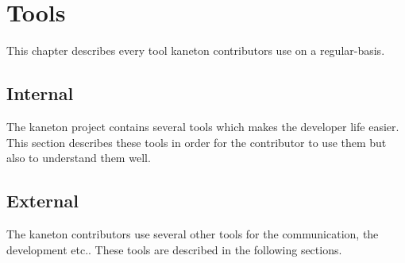 %
%
%
%
%
%

%
%

\chapter{Tools}
\label{chapter:tools}

This chapter describes every tool kaneton contributors use on a regular-basis.

\newpage

%
%

%
%

\section{Internal}

The kaneton project contains several tools which makes the developer life
easier. This section describes these tools in order for the contributor to
use them but also to understand them well.

























%
%

\section{External}

The kaneton contributors use several other tools for the communication, the
development etc.. These tools are described in the following sections.












